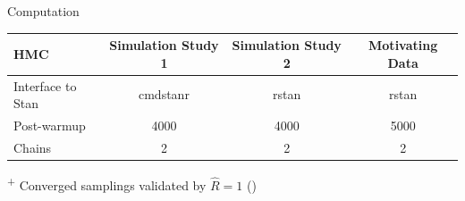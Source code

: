 \documentclass[fleqn]{beamer}
\begin{document}
\begin{frame}{Computation}

\begin{table}[H]
\footnotesize
\begin{threeparttable}
 \begin{tabular}{lccc}
    \toprule
 HMC & Simulation Study 1 & Simulation Study 2 & Motivating Data \\
 \midrule 
 Interface to Stan & cmdstanr & rstan & rstan \\
 Post-warmup \tnote{+} & 4000 & 4000 & 5000 \\
 Chains & 2 & 2 & 2\\
    \bottomrule
  \end{tabular}
\begin{tablenotes}
\tiny
\item{\textsuperscript{+}} Converged samplings validated by $\hat{R}=1$ (\cite{Gelman1992})
\end{tablenotes}
\end{threeparttable}
\end{table}
\end{frame}
\end{document}
